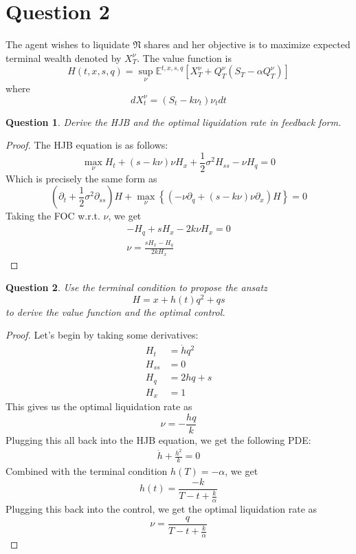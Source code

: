 \documentclass{amsart}
\newtheorem{theorem}{Question}[section]
\newcommand{\EE}{\mathbb{E}}
\begin{document}
\section{Question 2}
The agent wishes to liquidate $\mathfrak{N}$ shares and her objective is to maximize expected terminal wealth denoted by $X_T^{\nu}$. 
The value function is 
\[
H(t, x, s, q) = \sup_\nu \EE^{t, x, s, q} [X_T^\nu + Q_T^\nu(S_T - \alpha Q_T^\nu)]
\]
where 
\[
d X_t^\nu = (S_t - k \nu_t)\nu_t dt
\]
\begin{theorem}
    Derive the HJB and the optimal liquidation rate in feedback form.
\end{theorem}
\begin{proof}
    The HJB equation is as follows: 
    \[
    \max_{\nu} H_t + (s - k\nu) \nu H_x + \frac{1}{2} \sigma^2 H_{ss} - \nu H_q = 0 
    \]
    Which is precisely the same form as 
    \[
    \left(\partial_t + \frac12 \sigma^2 \partial_{ss}\right) H + \max_\nu \left\{
    \left(-\nu \partial_q + (s - k \nu)\nu \partial_x\right) H
    \right\} = 0
    \]
    Taking the FOC w.r.t. $\nu$, we get 
    \begin{align*}
        -H_q + sH_x - 2k \nu H_x = 0\\
        \nu = \frac{s H_x - H_q}{2k H_x}
    \end{align*}
\end{proof}
\begin{theorem}
    Use the terminal condition to propose the ansatz 
    \[
    H = x + h(t) q^2 + qs
    \]
    to derive the value function and the optimal control. 
\end{theorem}
\begin{proof}
    Let's begin by taking some derivatives: 
    \begin{align*}
        H_t &= \dot{h} q^2 \\
        H_{ss} &= 0 \\
        H_q &= 2 h q + s \\
        H_x &= 1
    \end{align*}
    This gives us the optimal liquidation rate as 
    \[
    \nu = -\frac{hq}{k}
    \]
    Plugging this all back into the HJB equation, we get the following PDE:
    \begin{align*}
        \dot{h} + \frac{h^2}{k} = 0
    \end{align*}
    Combined with the terminal condition $h(T) = -\alpha$, we get 
    \[
    h(t) = \frac{-k}{T - t + \frac{k}{\alpha}}
    \]
    Plugging this back into the control, we get the optimal liquidation rate as 
    \[
    \nu = \frac{q}{T - t + \frac{k}{\alpha}}
    \]
\end{proof}
\end{document}
